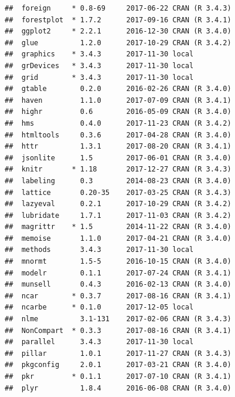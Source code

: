 \documentclass[12pt,]{krantz}
\theoremstyle{definition}
\theoremstyle{definition}
\theoremstyle{definition}
\theoremstyle{remark}
\begin{document}
\begin{verbatim}
##  foreign     * 0.8-69     2017-06-22 CRAN (R 3.4.3)                      
##  forestplot  * 1.7.2      2017-09-16 CRAN (R 3.4.1)                      
##  ggplot2     * 2.2.1      2016-12-30 CRAN (R 3.4.0)                      
##  glue          1.2.0      2017-10-29 CRAN (R 3.4.2)                      
##  graphics    * 3.4.3      2017-11-30 local                               
##  grDevices   * 3.4.3      2017-11-30 local                               
##  grid        * 3.4.3      2017-11-30 local                               
##  gtable        0.2.0      2016-02-26 CRAN (R 3.4.0)                      
##  haven         1.1.0      2017-07-09 CRAN (R 3.4.1)                      
##  highr         0.6        2016-05-09 CRAN (R 3.4.0)                      
##  hms           0.4.0      2017-11-23 CRAN (R 3.4.2)                      
##  htmltools     0.3.6      2017-04-28 CRAN (R 3.4.0)                      
##  httr          1.3.1      2017-08-20 CRAN (R 3.4.1)                      
##  jsonlite      1.5        2017-06-01 CRAN (R 3.4.0)                      
##  knitr       * 1.18       2017-12-27 CRAN (R 3.4.3)                      
##  labeling      0.3        2014-08-23 CRAN (R 3.4.0)                      
##  lattice       0.20-35    2017-03-25 CRAN (R 3.4.3)                      
##  lazyeval      0.2.1      2017-10-29 CRAN (R 3.4.2)                      
##  lubridate     1.7.1      2017-11-03 CRAN (R 3.4.2)                      
##  magrittr    * 1.5        2014-11-22 CRAN (R 3.4.0)                      
##  memoise       1.1.0      2017-04-21 CRAN (R 3.4.0)                      
##  methods       3.4.3      2017-11-30 local                               
##  mnormt        1.5-5      2016-10-15 CRAN (R 3.4.0)                      
##  modelr        0.1.1      2017-07-24 CRAN (R 3.4.1)                      
##  munsell       0.4.3      2016-02-13 CRAN (R 3.4.0)                      
##  ncar        * 0.3.7      2017-08-16 CRAN (R 3.4.1)                      
##  ncarbe      * 0.1.0      2017-12-05 local                               
##  nlme          3.1-131    2017-02-06 CRAN (R 3.4.3)                      
##  NonCompart  * 0.3.3      2017-08-16 CRAN (R 3.4.1)                      
##  parallel      3.4.3      2017-11-30 local                               
##  pillar        1.0.1      2017-11-27 CRAN (R 3.4.3)                      
##  pkgconfig     2.0.1      2017-03-21 CRAN (R 3.4.0)                      
##  pkr         * 0.1.1      2017-07-10 CRAN (R 3.4.1)                      
##  plyr          1.8.4      2016-06-08 CRAN (R 3.4.0)                      

\end{verbatim}
\end{document}
